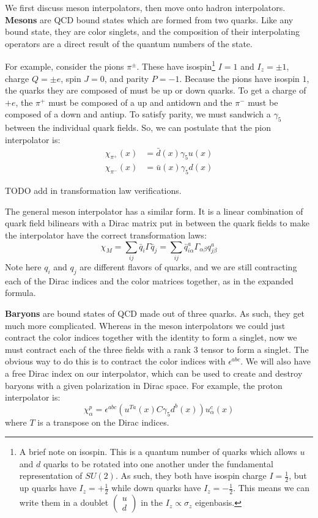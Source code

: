 \documentclass[11pt, oneside]{article}   	%
\theoremstyle{definition}
\begin{document}
We first discuss meson interpolators, then move onto hadron interpolators. \textbf{Mesons} are QCD bound states which are formed from two 
quarks. Like any bound state, they are color singlets, and the composition of their interpolating operators are a direct result of the quantum numbers 
of the state. 

For example, consider the pions $\pi^\pm$. These have isospin\footnote{A brief note on isospin. This is a quantum number of quarks 
which allows $u$ and $d$ quarks to be rotated into one another under the fundamental representation of $SU(2)$. As such, they both have isospin 
charge $I = \frac{1}{2}$, but up quarks have $I_z = +\frac{1}{2}$ while down quarks have $I_z = -\frac{1}{2}$. This means we can write them in a 
doublet $\begin{pmatrix} u \\ d \end{pmatrix}$ in the $I_z\propto\sigma_z$ eigenbasis.} $I = 1$ and $I_z = \pm 1$, charge $Q = \pm e$, spin 
$J = 0$, and parity $P = -1$. Because the pions have isospin $1$, the quarks they are composed of must be up or down quarks. To get a charge 
of $+e$, the $\pi^+$ must be composed of a up and antidown and the $\pi^-$ must be composed of a down and antiup. To satisfy parity, we must 
sandwich a $\gamma_5$ between the individual quark fields. So, we can postulate that the pion interpolator is:
\begin{align}
	\chi_{\pi^+}(x) &= \bar d(x)\gamma_5 u(x) \\
	\chi_{\pi^-}(x) &= \bar u(x)\gamma_5 d(x)
\end{align}

TODO add in transformation law verifications.

The general meson interpolator has a similar form. It is a linear combination of quark field bilinears with a Dirac matrix put in between the quark fields 
to make the interpolator have the correct transformation laws:
\begin{equation}
	\chi_M = \sum_{ij} \bar q_{i} \Gamma \bar q_j = \sum_{ij} \bar q_{i\alpha}^a \Gamma_{\alpha\beta} q_{j\beta}^a
\end{equation}
Note here $q_i$ and $q_j$ are different flavors of quarks, and we are still contracting each of the Dirac indices and the color matrices together, as 
in the expanded formula. 

\textbf{Baryons} are bound states of QCD made out of three quarks. As such, they get much more complicated. Whereas in the meson interpolators 
we could just contract the color indices together with the identity to form a singlet, now we must contract each of the three fields with a rank 
3 tensor to form a singlet. The obvious way to do this is to contract the color indices with $\epsilon^{abc}$. We will also have a free Dirac index 
on our interpolator, which can be used to create and destroy baryons with a given polarization in Dirac space. For example, the proton interpolator 
is:
\begin{equation}
	\chi^p_\alpha = \epsilon^{abc} (u^{T a}(x) C\gamma_5 d^b(x)) u_\alpha^c(x)
\end{equation}
where $T$ is a transpose on the Dirac indices. 
\end{document}
